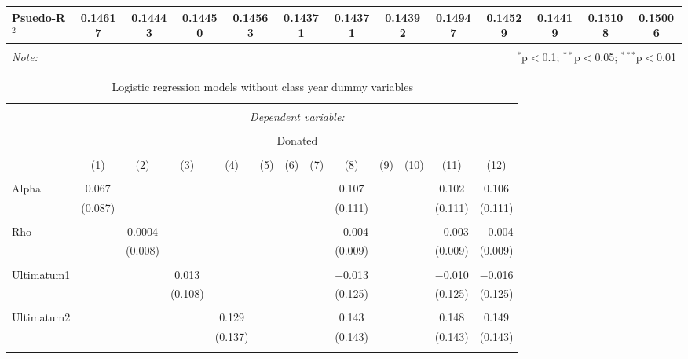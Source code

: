 \begin{subtables}
\begin{table}[H]
\begin{adjustbox}{width=\textwidth}
\begin{tabular}{@{\extracolsep{5pt}}lcccccccccccc}
  Psuedo-R$^{2}$ & 0.14617 & 0.14443 &0.14450 & 0.14563 & 0.14371 &0.14371 & 0.14392 & 0.14947 & 0.14529 & 0.14419 & 0.15108 & 0.15006 \\
  \hline 
\hline \\[-1.8ex] 
\textit{Note:}  & \multicolumn{12}{r}{$^{*}$p$<$0.1; $^{**}$p$<$0.05; $^{***}$p$<$0.01} \\ 
\end{tabular} 
\end{adjustbox}
\end{table} 

\begin{table}[H] \centering 
  \caption{Logistic regression models without class year dummy variables} 
  \label{} 
  \begin{adjustbox}{width=\textwidth}
  \begin{tabular}{@{\extracolsep{5pt}}lcccccccccccc} 
\\[-1.8ex]\hline 
\hline \\[-1.8ex] 
 & \multicolumn{12}{c}{\textit{Dependent variable:}} \\ 
\cline{2-13} 
\\[-1.8ex] & \multicolumn{12}{c}{Donated} \\ 
\\[-1.8ex] & (1) & (2) & (3) & (4) & (5) & (6) & (7) & (8) & (9) & (10) & (11) & (12)\\ 
\hline \\[-1.8ex] 
 Alpha & 0.067 &  &  &  &  &  &  & 0.107 &  &  & 0.102 & 0.106 \\ 
  & (0.087) &  &  &  &  &  &  & (0.111) &  &  & (0.111) & (0.111) \\ 
  & & & & & & & & & & & & \\ 
 Rho &  & 0.0004 &  &  &  &  &  & $-$0.004 &  &  & $-$0.003 & $-$0.004 \\ 
  &  & (0.008) &  &  &  &  &  & (0.009) &  &  & (0.009) & (0.009) \\ 
  & & & & & & & & & & & & \\ 
 Ultimatum1 &  &  & 0.013 &  &  &  &  & $-$0.013 &  &  & $-$0.010 & $-$0.016 \\ 
  &  &  & (0.108) &  &  &  &  & (0.125) &  &  & (0.125) & (0.125) \\ 
  & & & & & & & & & & & & \\ 
 Ultimatum2 &  &  &  & 0.129 &  &  &  & 0.143 &  &  & 0.148 & 0.149 \\ 
  &  &  &  & (0.137) &  &  &  & (0.143) &  &  & (0.143) & (0.143) \\ 
  & & & & & & & & & & & & \\ 

\end{tabular}
\end{adjustbox}
\end{table}
\end{subtables}
